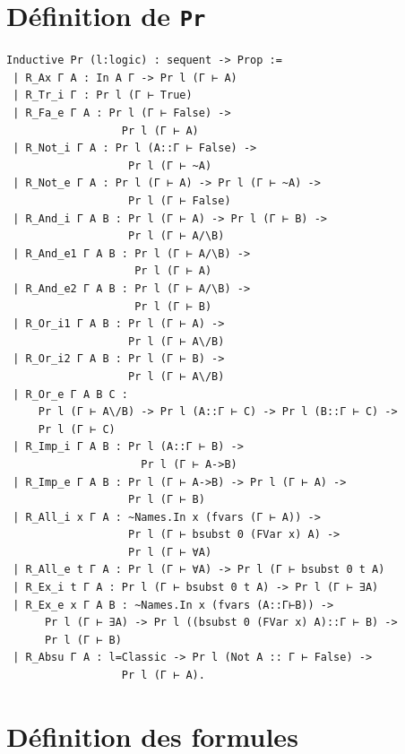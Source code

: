 \documentclass[a4paper]{article}
\theoremstyle{remark}
\theoremstyle{remark}
\theoremstyle{remark}
\theoremstyle{definition}
\theoremstyle{definition}
\theoremstyle{definition}
\begin{document}


\nocite{*}


\appendix
\newpage



\section{Définition de \texttt{Pr}} \label{pr}

\begin{verbatim}
Inductive Pr (l:logic) : sequent -> Prop :=
 | R_Ax Γ A : In A Γ -> Pr l (Γ ⊢ A)
 | R_Tr_i Γ : Pr l (Γ ⊢ True)
 | R_Fa_e Γ A : Pr l (Γ ⊢ False) ->
                  Pr l (Γ ⊢ A)
 | R_Not_i Γ A : Pr l (A::Γ ⊢ False) ->
                   Pr l (Γ ⊢ ~A)
 | R_Not_e Γ A : Pr l (Γ ⊢ A) -> Pr l (Γ ⊢ ~A) ->
                   Pr l (Γ ⊢ False)
 | R_And_i Γ A B : Pr l (Γ ⊢ A) -> Pr l (Γ ⊢ B) ->
                   Pr l (Γ ⊢ A/\B)
 | R_And_e1 Γ A B : Pr l (Γ ⊢ A/\B) ->
                    Pr l (Γ ⊢ A)
 | R_And_e2 Γ A B : Pr l (Γ ⊢ A/\B) ->
                    Pr l (Γ ⊢ B)
 | R_Or_i1 Γ A B : Pr l (Γ ⊢ A) ->
                   Pr l (Γ ⊢ A\/B)
 | R_Or_i2 Γ A B : Pr l (Γ ⊢ B) ->
                   Pr l (Γ ⊢ A\/B)
 | R_Or_e Γ A B C :
     Pr l (Γ ⊢ A\/B) -> Pr l (A::Γ ⊢ C) -> Pr l (B::Γ ⊢ C) ->
     Pr l (Γ ⊢ C)
 | R_Imp_i Γ A B : Pr l (A::Γ ⊢ B) ->
                     Pr l (Γ ⊢ A->B)
 | R_Imp_e Γ A B : Pr l (Γ ⊢ A->B) -> Pr l (Γ ⊢ A) ->
                   Pr l (Γ ⊢ B)
 | R_All_i x Γ A : ~Names.In x (fvars (Γ ⊢ A)) ->
                   Pr l (Γ ⊢ bsubst 0 (FVar x) A) ->
                   Pr l (Γ ⊢ ∀A)
 | R_All_e t Γ A : Pr l (Γ ⊢ ∀A) -> Pr l (Γ ⊢ bsubst 0 t A)
 | R_Ex_i t Γ A : Pr l (Γ ⊢ bsubst 0 t A) -> Pr l (Γ ⊢ ∃A)
 | R_Ex_e x Γ A B : ~Names.In x (fvars (A::Γ⊢B)) ->
      Pr l (Γ ⊢ ∃A) -> Pr l ((bsubst 0 (FVar x) A)::Γ ⊢ B) ->
      Pr l (Γ ⊢ B)
 | R_Absu Γ A : l=Classic -> Pr l (Not A :: Γ ⊢ False) ->
                  Pr l (Γ ⊢ A).
\end{verbatim}

\section{Définition des formules} \label{form}
\end{document}
